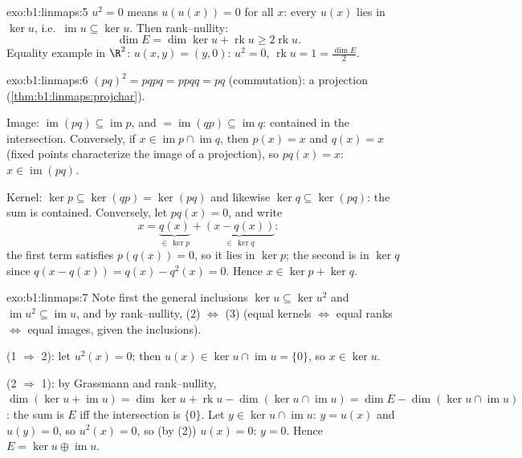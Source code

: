 \begin{solution}{exo:b1:linmaps:5}
$u^2 = 0$ means $u(u(x)) = 0$ for all $x$: every $u(x)$ lies in
$\ker u$, i.e.\ $\operatorname{im} u \subseteq \ker u$. Then
rank--nullity:
\[
\dim E = \dim\ker u + \operatorname{rk} u \geq 2\operatorname{rk} u .
\]
Equality example in $\R^2$: $u(x, y) = (y, 0)$: $u^2 = 0$,
$\operatorname{rk} u = 1 = \frac{\dim E}{2}$.
\end{solution}

\begin{solution}{exo:b1:linmaps:6}
$(pq)^2 = pqpq = ppqq = pq$ (commutation): a projection
(\cref{thm:b1:linmaps:projchar}).

Image: $\operatorname{im}(pq) \subseteq \operatorname{im} p$, and
$= \operatorname{im}(qp) \subseteq \operatorname{im} q$: contained
in the intersection. Conversely, if $x \in \operatorname{im} p \cap
\operatorname{im} q$, then $p(x) = x$ and $q(x) = x$ (fixed points
characterize the image of a projection), so $pq(x) = x$: $x \in
\operatorname{im}(pq)$.

Kernel: $\ker p \subseteq \ker(qp) = \ker(pq)$ and likewise $\ker q
\subseteq \ker(pq)$: the sum is contained. Conversely, let $pq(x) =
0$, and write
\[
x = \underbrace{q(x)}_{\in\, \ker p} +
\underbrace{(x - q(x))}_{\in\, \ker q} :
\]
the first term satisfies $p(q(x)) = 0$, so it lies in $\ker p$; the
second is in $\ker q$ since $q(x - q(x)) = q(x) - q^2(x) = 0$. Hence
$x \in \ker p + \ker q$.
\end{solution}

\begin{solution}{exo:b1:linmaps:7}
Note first the general inclusions $\ker u \subseteq \ker u^2$ and
$\operatorname{im} u^2 \subseteq \operatorname{im} u$, and by
rank--nullity, (2) $\iff$ (3) (equal kernels $\iff$ equal ranks
$\iff$ equal images, given the inclusions).

(1 $\Rightarrow$ 2): let $u^2(x) = 0$; then $u(x) \in \ker u \cap
\operatorname{im} u = \{0\}$, so $x \in \ker u$.

(2 $\Rightarrow$ 1): by Grassmann and rank--nullity, $\dim(\ker u +
\operatorname{im} u) = \dim\ker u + \operatorname{rk} u -
\dim(\ker u \cap \operatorname{im} u) = \dim E - \dim(\ker u \cap
\operatorname{im} u)$: the sum is $E$ iff the intersection is
$\{0\}$. Let $y \in \ker u \cap \operatorname{im} u$: $y = u(x)$ and
$u(y) = 0$, so $u^2(x) = 0$, so (by (2)) $u(x) = 0$: $y = 0$. Hence
$E = \ker u \oplus \operatorname{im} u$.
\end{solution}

